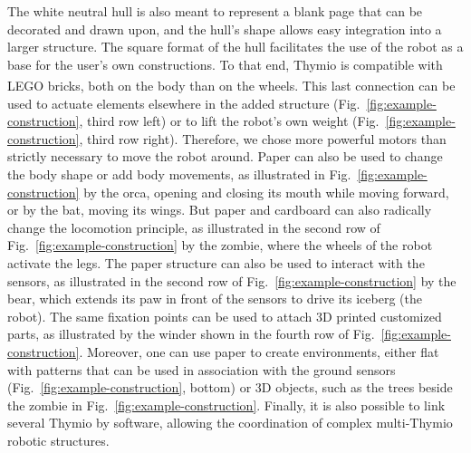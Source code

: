 \documentclass[letterpaper, 10 pt, conference]{ieeeconf}  %
\begin{document}
The white neutral hull is also meant to represent a blank page that can be decorated and drawn upon, and the hull's shape allows easy integration into a larger structure.
The square format of the hull facilitates the use of the robot as a base for the user's own constructions.
To that end, Thymio is compatible with LEGO\textsuperscript{\textregistered} bricks, both on the body than on the wheels. 
This last connection can be used to actuate elements elsewhere in the added structure (Fig.~\ref{fig:example-construction}, third row left) or to lift the robot's own weight (Fig.~\ref{fig:example-construction}, third row right).
Therefore, we chose more powerful motors than strictly necessary to move the robot around.
Paper can also be used to change the body shape or add body movements, as illustrated in Fig.~\ref{fig:example-construction} by the orca, opening and closing its mouth while moving forward, or by the bat, moving its wings. 
But paper and cardboard can also radically change the locomotion principle, as illustrated in the second row of Fig.~\ref{fig:example-construction} by the zombie, where the wheels of the robot activate the legs. 
The paper structure can also be used to interact with the sensors, as illustrated in the second row of Fig.~\ref{fig:example-construction} by the bear, which extends its paw in front of the sensors to drive its iceberg (the robot).
The same fixation points can be used to attach 3D printed customized parts, as illustrated by the winder shown in the fourth row of Fig.~\ref{fig:example-construction}.
Moreover, one can use paper to create environments, either flat with patterns that can be used in association with the ground sensors (Fig.~\ref{fig:example-construction}, bottom) or 3D objects, such as the trees beside the zombie in Fig.~\ref{fig:example-construction}.
Finally, it is also possible to link several Thymio by software, allowing the coordination of complex multi-Thymio robotic structures.
\end{document}
